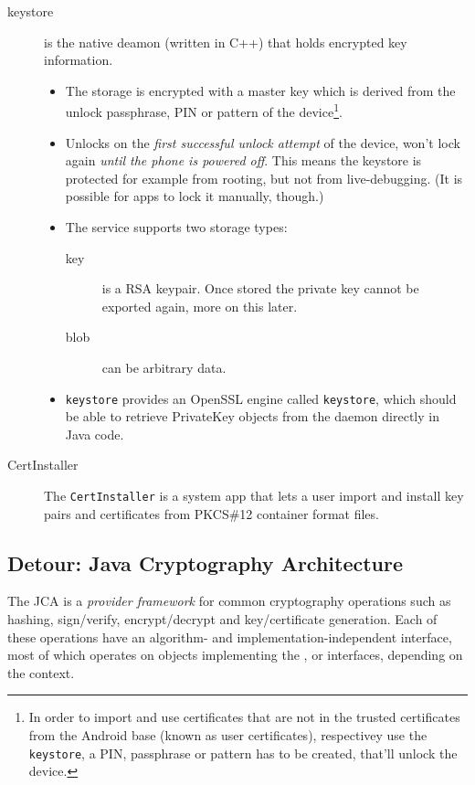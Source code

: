\documentclass[a4paper,draft]{scrartcl}
\begin{document}
\begin{description}
			\item[keystore] is the native deamon (written in C++) that holds encrypted key information.
				\begin{itemize}
					\item The storage is encrypted with a master key which is derived from the unlock passphrase, PIN or pattern of the device\footnote{In order to import and use certificates that are not in the trusted certificates from the Android base (known as user certificates), respectivey use the \texttt{keystore}, a PIN, passphrase or pattern has to be created, that'll unlock the device.}.
					\item Unlocks on the \emph{first successful unlock attempt} of the device, won't lock again \emph{until the phone is powered off}. This means the keystore is protected for example from rooting, but not from live-debugging. (It is possible for apps to lock it manually, though.)
					\item The service supports two storage types:
					\begin{description}
						\item[key] is a RSA keypair. Once stored the private key cannot be exported again, more on this later.
						\item[blob] can be arbitrary data.
					\end{description}
					\item \texttt{keystore} provides an OpenSSL engine called \texttt{keystore}, which should be able to retrieve PrivateKey objects from the daemon directly in Java code.
				\end{itemize}
			\item [CertInstaller] The \texttt{CertInstaller} is a system app that lets a user import and install key pairs and certificates from PKCS\#12 container format files. %
		\end{description}

	\subsection*{Detour: Java Cryptography Architecture}
		The JCA is a {\em provider framework} for common cryptography operations such as hashing, sign/verify,
		encrypt/decrypt and key/certificate generation. Each of these operations have an algorithm- and
		implementation-independent interface, most of which operates on objects implementing the
		,  or 
		interfaces, depending on the context.
\end{document}
